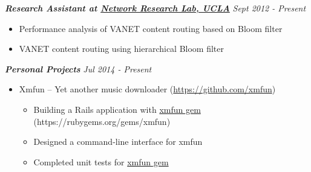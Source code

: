 \documentclass[9pt]{article}
\newenvironment{changemargin}[2]{%
  \begin{list}{}{%
    \setlength{\topsep}{0pt}%
    \setlength{\leftmargin}{#1}%
    \setlength{\rightmargin}{#2}%
    \setlength{\listparindent}{\parindent}%
    \setlength{\itemindent}{\parindent}%
    \setlength{\parsep}{\parskip}%
  }%
  \item[]}{\end{list}
  }
\newenvironment{body} {
  \vspace*{-16pt}
  \begin{changemargin}{-0.25in}{-0.5in}
  }
  {\end{changemargin}
  }
\begin{document}
\begin{body}
  \emph{\textbf{Research Assistant at \href{http://nrlweb.cs.ucla.edu/}
    {Network Research Lab, UCLA}}}
  \hfill\emph{Sept 2012 - Present}
  \vspace*{-2pt}
  \begin{itemize}[leftmargin=0.15in]
    \item
    Performance analysis of VANET content routing based on Bloom filter
    \vspace*{-2pt}
    \item
    VANET content routing using hierarchical Bloom filter
    \vspace*{-2pt}
  \end{itemize}
  
  \emph{\textbf{Personal Projects}}
  \hfill\emph{Jul 2014 - Present}
  \vspace*{-2pt}
  \begin{itemize}[leftmargin=0.15in]
    \item
    Xmfun -- Yet another music downloader (\href{https://github.com/xmfun}
    {https://github.com/xmfun})
    \begin{itemize}[leftmargin=0.1in]
      \item
      Building a Rails application with \href{https://rubygems.org/gems/xmfun}
      {xmfun gem} (https://rubygems.org/gems/xmfun)
      \item
      Designed a command-line interface for xmfun
      \item
      Completed unit tests for \href{https://rubygems.org/gems/xmfun}
      {xmfun gem}
    \end{itemize}
  \end{itemize}
\end{body}
\end{document}
